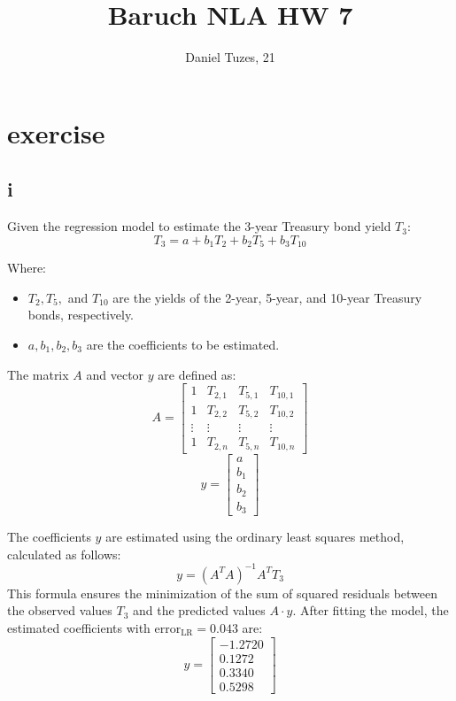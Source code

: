 \documentclass{article}
\title{Baruch NLA HW 7}
\author{Daniel Tuzes, 21}
\begin{document}
\maketitle
\section{exercise}
\subsection*{i}
Given the regression model to estimate the 3-year Treasury bond yield \( T_3 \):
\[ T_3 = a + b_1 T_2 + b_2 T_5 + b_3 T_{10} \]

Where:
\begin{itemize}
    \item \( T_2, T_5, \) and \( T_{10} \) are the yields of the 2-year, 5-year, and 10-year Treasury bonds, respectively.
    \item \( a, b_1, b_2, b_3 \) are the coefficients to be estimated.
\end{itemize}

The matrix \( A \) and vector \( y \) are defined as:
\[ A = \begin{bmatrix}
        1      & T_{2,1} & T_{5,1} & T_{10,1} \\
        1      & T_{2,2} & T_{5,2} & T_{10,2} \\
        \vdots & \vdots  & \vdots  & \vdots   \\
        1      & T_{2,n} & T_{5,n} & T_{10,n}
    \end{bmatrix} \]
\[ y = \begin{bmatrix} a \\ b_1 \\ b_2 \\ b_3 \end{bmatrix} \]

The coefficients \( y \) are estimated using the
ordinary least squares method,
calculated as follows:
\[ y = (A^T A)^{-1} A^T T_3 \]
This formula ensures the minimization of the sum of
squared residuals between the observed values \( T_3 \)
and the predicted values \( A \cdot y \).
After fitting the model,
the estimated coefficients with $\text{error}_{\text{LR}} = 0.043$ are:
\[ y = \begin{bmatrix}
        -1.2720 \\
        0.1272  \\
        0.3340  \\
        0.5298
    \end{bmatrix} \]
\end{document}
